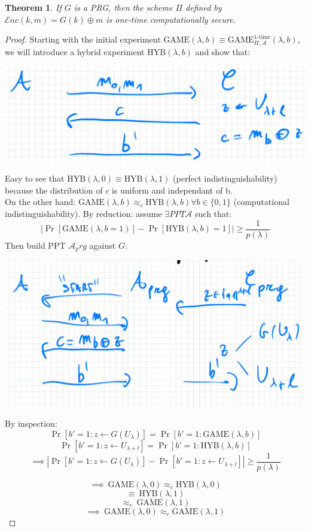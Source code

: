 \documentclass[11pt, a4paper]{article}
\newcommand{\enc}{\mathcal{E}nc}
\newcommand{\game}{\text{GAME}}
\newtheorem{thm}{Theorem}
\begin{document}
\begin{thm}
    If $G$ is a PRG, then the scheme $\Pi$ defined by $\enc(k,m) = G(k) \oplus m$ is one-time computationally secure.
\end{thm}
\begin{proof}
    Starting with the initial experiment $\game(\lambda,b) \equiv \game_{\Pi, \mathcal{A}}^{1\text{-time}}(\lambda, b)$, we will introduce a hybrid experiment $\text{HYB}(\lambda, b)$ and show that:
    \begin{center}
        \includegraphics[scale=0.5]{img/Comp_sec/HYb.png}
    \end{center}
    Easy to see that $\text{HYB}(\lambda, 0) \equiv \text{HYB}(\lambda, 1)$ (perfect indistinguishability) because the distribution of $c$ is uniform and independant of b.\\
    On the other hand: $\game(\lambda, b) \approx_c \text{HYB}(\lambda, b) \forall b \in \{0,1\}$ (computational indistinguishability). By reduction: assume $\exists PPT \mathcal{A}$ such that:\\
    $$|\Pr[\game(\lambda,b = 1)] - \Pr[\text{HYB}(\lambda,b)= 1]| \geq \frac{1}{p(\lambda)}$$
    Then build PPT $\mathcal{A}_prg$ against $G$:
    \begin{center}
        \includegraphics[scale=0.5]{img/Comp_sec/red2.png}
    \end{center}
    By inspection:\\
    \[
\Pr\left[ b' = 1 : z \leftarrow G(U_\lambda) \right] = \Pr\left[ b' = 1 : \game(\lambda, b) \right]
\]
\[
\Pr\left[ b' = 1 : z \leftarrow U_{\lambda + l} \right] = \Pr\left[ b' = 1 : \text{HYB}(\lambda, b) \right]
\]
\[
\implies \left| \Pr\left[ b' = 1 : z \leftarrow G(U_\lambda) \right] - \Pr\left[ b' = 1 : z \leftarrow U_{\lambda + l} \right] \right| \geq \frac{1}{p(\lambda)}
\]

\[
\implies\ \game(\lambda, 0) \approx_c \text{HYB}(\lambda, 0)
\]
\[
\equiv\ \text{HYB}(\lambda, 1)
\]
\[
\approx_c\ \game(\lambda, 1)
\]
\[
\implies\ \game(\lambda, 0) \approx_c \game(\lambda, 1)
\]
\end{proof}
\end{document}
